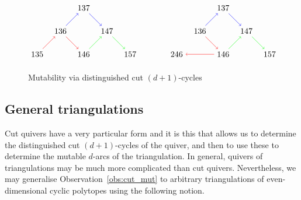 \documentclass[ALCO,Unicode,published]{cedram}
\begin{document}
\begin{figure}
\caption{Mutability via distinguished cut $(d + 1)$-cycles}\label{fig:mut_via_cyc}
\[
\begin{tikzpicture}

\begin{scope}[shift={(-3,0)}]

\node(135) at (0,0) {$135$};
\node(136) at (1,1) {$136$};
\node(137) at (2,2) {$137$};
\node(146) at (2,0) {$146$};
\node(147) at (3,1) {$147$};
\node(157) at (4,0) {$157$};

\draw[red,->] (135) -- (136);
\draw[blue,->] (136) -- (137);
\draw[blue,->] (137) -- (147);
\draw[green,->] (147) -- (157);
\draw[red,->] (136) -- (146);
\draw[green,->] (146) -- (147);

\end{scope}

\begin{scope}[shift={(3,0)}]

\node(246) at (0,0) {$246$};
\node(136) at (1,1) {$136$};
\node(137) at (2,2) {$137$};
\node(146) at (2,0) {$146$};
\node(147) at (3,1) {$147$};
\node(157) at (4,0) {$157$};

\draw[red,->] (146) -- (246);
\draw[blue,->] (136) -- (137);
\draw[blue,->] (137) -- (147);
\draw[green,->] (147) -- (157);
\draw[red,->] (136) -- (146);
\draw[green,->] (146) -- (147);

\end{scope}

\end{tikzpicture}
\]
\end{figure}

\subsection{General triangulations}\label{sect:mut:gen}

Cut quivers have a very particular form and it is this that allows us to determine the distinguished cut $(d + 1)$-cycles of the quiver, and then to use these to determine the mutable $d$-arcs of the triangulation. In general, quivers of triangulations may be much more complicated than cut quivers. Nevertheless, we may generalise Observation~\ref{obs:cut_mut} to arbitrary triangulations of even-dimensional cyclic polytopes using the following notion.
\end{document}

